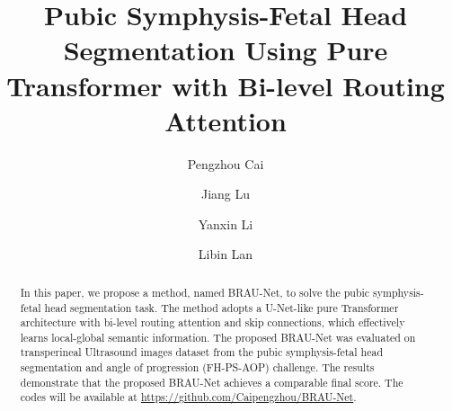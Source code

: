 \documentclass[preprint,12pt]{elsarticle}
\begin{document}
\begin{frontmatter}



\title{Pubic Symphysis-Fetal Head Segmentation Using Pure Transformer with Bi-level Routing Attention}


\author{Pengzhou Cai}
\author{Jiang Lu}
\author{Yanxin Li}
\author{Libin Lan}
\address{College of Computer Science and Engineering
            ,Chongqing University of Technology, 
            Chongqing,
            400054, 
            China}




\begin{abstract}
In this paper, we propose a method, named BRAU-Net, to solve the pubic symphysis-fetal head segmentation task. The method adopts a U-Net-like pure Transformer architecture with bi-level routing attention and skip connections, which effectively learns local-global semantic information. The proposed BRAU-Net was evaluated on transperineal Ultrasound images dataset from the pubic symphysis-fetal head segmentation and angle of progression (FH-PS-AOP) challenge. The results demonstrate that the proposed BRAU-Net achieves a comparable final score. The codes will be available at \href{https://github.com/Caipengzhou/BRAU-Net}{https://github.com/Caipengzhou/BRAU-Net}.
\end{abstract}


\end{frontmatter}
\end{document}
